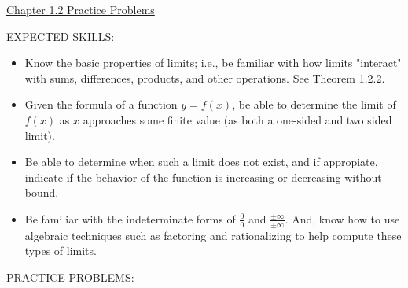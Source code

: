 \documentclass[12pt]{article}
\begin{document}
\begin{center}
\underline{\LARGE{Chapter 1.2 Practice Problems}}
\end{center}

\noindent EXPECTED SKILLS:

\begin{itemize}

\item Know the basic properties of limits; i.e., be familiar with how limits "interact" with sums, differences, products, and other operations.  See Theorem 1.2.2.

\item Given the formula of a function $y=f(x)$, be able to determine the limit of $f(x)$ as $x$ approaches some finite value (as both a one-sided and two sided limit).

\item Be able to determine when such a limit does not exist, and if appropiate, indicate if the behavior of the function is increasing or decreasing without bound.

\item Be familiar with the indeterminate forms of $\displaystyle \frac{0}{0}$ and $\displaystyle \frac{\pm \infty}{\pm \infty}$.  And, know how to use algebraic techniques such as factoring and rationalizing to help compute these types of limits.

\end{itemize}

\noindent PRACTICE PROBLEMS:

\end{document}
